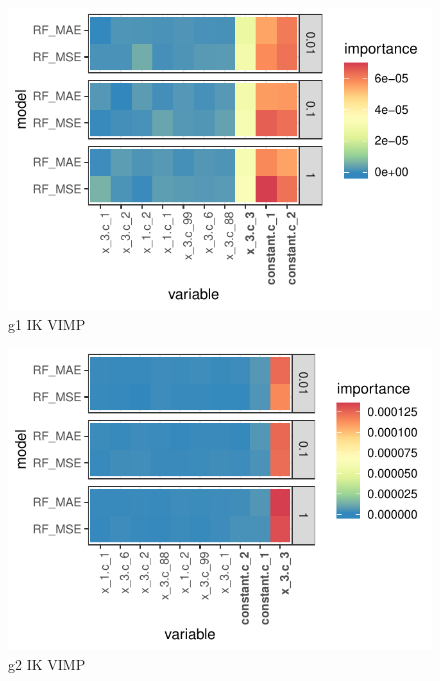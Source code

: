 \documentclass[11pt, a4paper, table]{article}
\begin{document}
\begin{figure}
	\includegraphics[]{../Results/simulation/graphics/simulation_g1_vimp_ik.pdf}
	\caption{g1 IK VIMP}
\end{figure}

\begin{figure}
	\includegraphics[]{../Results/simulation/graphics/simulation_g2_vimp_ik.pdf}
	\caption{g2 IK VIMP}
\end{figure}
\end{document}
